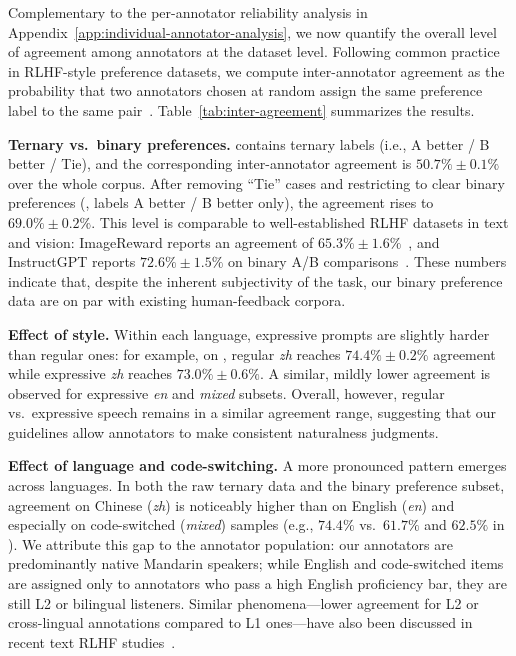 \documentclass[]{bytedance_seed}
\begin{document}
Complementary to the per-annotator reliability analysis in
Appendix~\ref{app:individual-annotator-analysis}, we now quantify the overall level of
agreement among annotators at the dataset level.
Following common practice in RLHF-style preference datasets, we compute inter-annotator agreement as the probability that two annotators chosen at random assign the same preference label to the same pair~\citep{openai-rm,instructgpt,imagereward}.
Table~\ref{tab:inter-agreement} summarizes the results.

\textbf{Ternary vs.\ binary preferences.}\quad
{} contains ternary labels
(i.e., {A better} / {B better} / {Tie}), and the corresponding
inter-annotator agreement is $50.7\%\pm0.1\%$ over the whole corpus.
After removing ``Tie'' cases and restricting to clear binary preferences
(, labels
{A better} / {B better} only), the agreement rises to
$69.0\%\pm0.2\%$.
This level is comparable to well-established RLHF datasets in text and vision:
ImageReward reports an agreement of $65.3\%\pm1.6\%$~\citep{imagereward},
and InstructGPT reports $72.6\%\pm1.5\%$ on binary A/B comparisons~\citep{instructgpt}.
These numbers indicate that, despite the inherent subjectivity of the task,
our binary preference data are on par with existing human-feedback corpora.

\textbf{Effect of style.}\quad
Within each language, expressive prompts are slightly harder than regular ones:
for example, on , regular \textit{zh} reaches
$74.4\%\pm0.2\%$ agreement while expressive \textit{zh} reaches
$73.0\%\pm0.6\%$.
A similar, mildly lower agreement is observed for expressive \textit{en} and
\textit{mixed} subsets.
Overall, however, regular vs.\ expressive speech remains in a similar agreement
range, suggesting that our guidelines allow annotators to make consistent naturalness judgments.

\textbf{Effect of language and code-switching.} \quad
A more pronounced pattern emerges across languages.
In both the raw ternary data and the binary preference subset, agreement on
Chinese (\textit{zh}) is noticeably higher than on English (\textit{en})
and especially on code-switched (\textit{mixed}) samples
(e.g., $74.4\%$ vs.\ $61.7\%$ and $62.5\%$ in
).
We attribute this gap to the annotator population:
our annotators are predominantly native Mandarin speakers; while English and
code-switched items are assigned only to annotators who pass a high English
proficiency bar, they are still L2 or bilingual listeners.
Similar phenomena---lower agreement for L2 or cross-lingual annotations
compared to L1 ones—have also been discussed in recent text RLHF studies~\citep{RLHF-anthoropic}.
\end{document}
